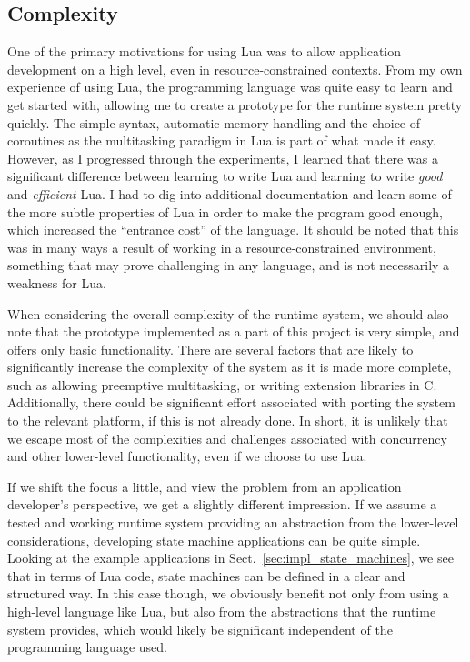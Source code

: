 \subsection{Complexity}
\label{sec:disq_complexity}
One of the primary motivations for using Lua was to allow application development on a high level, even in resource-constrained contexts. From my own experience of using Lua, the programming language was quite easy to learn and get started with, allowing me to create a prototype for the runtime system pretty quickly. The simple syntax, automatic memory handling and the choice of coroutines as the multitasking paradigm in Lua is part of what made it easy. However, as I progressed through the experiments, I learned that there was a significant difference between learning to write Lua and learning to write \emph{good} and \emph{efficient} Lua. I had to dig into additional documentation and learn some of the more subtle properties of Lua in order to make the program good enough, which increased the ``entrance cost'' of the language. It should be noted that this was in many ways a result of working in a resource-constrained environment, something that may prove challenging in any language, and is not necessarily a weakness for Lua.

When considering the overall complexity of the runtime system, we should also note that the prototype implemented as a part of this project is very simple, and offers only basic functionality. There are several factors that are likely to significantly increase the complexity of the system as it is made more complete, such as allowing preemptive multitasking, or writing extension libraries in C. Additionally, there could be significant effort associated with porting the system to the relevant platform, if this is not already done. In short, it is unlikely that we escape most of the complexities and challenges associated with concurrency and other lower-level functionality, even if we choose to use Lua.

If we shift the focus a little, and view the problem from an application developer's perspective, we get a slightly different impression. If we assume a tested and working runtime system providing an abstraction from the lower-level considerations, developing state machine applications can be quite simple. Looking at the example applications in Sect.~\ref{sec:impl_state_machines}, we see that in terms of Lua code, state machines can be defined in a clear and structured way. In this case though, we obviously benefit not only from using a high-level language like Lua, but also from the abstractions that the runtime system provides, which would likely be significant independent of the programming language used.

